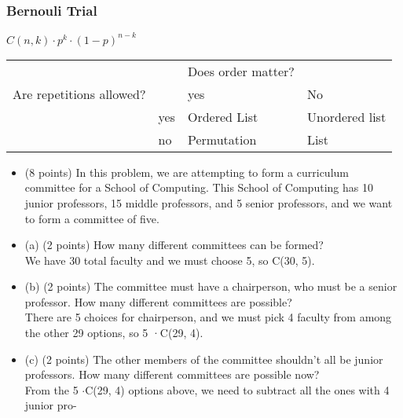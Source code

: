 \documentclass[8pt]{article}
\begin{document}
\begin{paracol}{3}
        \subsubsection*{Bernouli Trial}
        $C(n,k) \cdot p^k \cdot (1-p)^{n-k}$ \\
        \begin{tabular}{llll}
            &                          & Does order matter?                &                                     \\ \cline{2-4}
            \multicolumn{1}{l|}{Are repetitions allowed?} & \multicolumn{1}{l|}{}    & \multicolumn{1}{l|}{yes}          & \multicolumn{1}{l|}{No}             \\ \cline{2-4}
            \multicolumn{1}{l|}{}                         & \multicolumn{1}{l|}{yes} & \multicolumn{1}{l|}{Ordered List} & \multicolumn{1}{l|}{Unordered list} \\ \cline{2-4}
            \multicolumn{1}{l|}{}                         & \multicolumn{1}{l|}{no}  & \multicolumn{1}{l|}{Permutation}  & \multicolumn{1}{l|}{List}           \\ \cline{2-4}
        \end{tabular}
        \switchcolumn
        \begin{itemize}[noitemsep]
            \item (8 points) In this problem, we are attempting to form a curriculum committee for a School
            of Computing. This School of Computing has 10 junior professors, 15 middle professors, and
            5 senior professors, and we want to form a committee of five.
            \item  (a) (2 points) How many different committees can be formed?
            \\ We have 30 total faculty and we must choose 5, so C(30, 5).
            \item (b) (2 points) The committee must have a chairperson, who must be a senior professor.
            How many different committees are possible?
            \\ There are 5 choices for chairperson, and we must pick 4 faculty from among the other
            29 options, so 5 ·C(29, 4).
            \item  (c) (2 points) The other members of the committee shouldn’t all be junior professors. How
            many different committees are possible now?
           \\  From the 5 $\cdot$C(29, 4) options above, we need to subtract all the ones with 4 junior pro-

\end{itemize}
\end{paracol}
\end{document}
